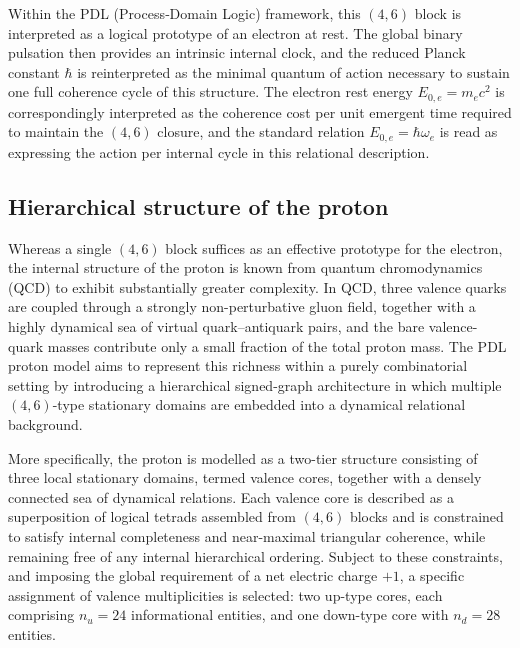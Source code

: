 \documentclass[11pt,a4paper]{article}
\begin{document}
Within the PDL (Process‑Domain Logic) framework, this $(4,6)$ block is interpreted as a logical prototype of an electron at rest.\cite{LaubscherIntroPDL2026,LaubscherPDLFull2026} The global binary pulsation then provides an intrinsic internal clock, and the reduced Planck constant $\hbar$ is reinterpreted as the minimal quantum of action necessary to sustain one full coherence cycle of this structure. The electron rest energy $E_{0,e}=m_ec^2$ is correspondingly interpreted as the coherence cost per unit emergent time required to maintain the $(4,6)$ closure, and the standard relation $E_{0,e}=\hbar\omega_e$ is read as expressing the action per internal cycle in this relational description.\cite{LaubscherLDP2026,LaubscherIMRadPDL2026}

\subsection{Hierarchical structure of the proton}
Whereas a single $(4,6)$ block suffices as an effective prototype for the electron, the internal structure of the proton is known from quantum chromodynamics (QCD) to exhibit substantially greater complexity. In QCD, three valence quarks are coupled through a strongly non-perturbative gluon field, together with a highly dynamical sea of virtual quark–antiquark pairs, and the bare valence-quark masses contribute only a small fraction of the total proton mass.\cite{AmslerQCDProton} The PDL proton model aims to represent this richness within a purely combinatorial setting by introducing a hierarchical signed-graph architecture in which multiple $(4,6)$-type stationary domains are embedded into a dynamical relational background.\cite{LaubscherIntroPDL2026,LaubscherPDLFull2026,LaubscherLDP2026}

More specifically, the proton is modelled as a two-tier structure consisting of three local stationary domains, termed valence cores, together with a densely connected sea of dynamical relations.\cite{LaubscherPDLFull2026,LaubscherLDP2026} Each valence core is described as a superposition of logical tetrads assembled from $(4,6)$ blocks and is constrained to satisfy internal completeness and near-maximal triangular coherence, while remaining free of any internal hierarchical ordering. Subject to these constraints, and imposing the global requirement of a net electric charge $+1$, a specific assignment of valence multiplicities is selected: two up-type cores, each comprising $n_u=24$ informational entities, and one down-type core with $n_d=28$ entities.\cite{LaubscherPDLFull2026,LaubscherLDP2026}
\end{document}
